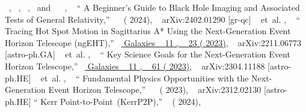 \documentclass[aps,reprint,superscriptaddress,nofootinbib,floatfix,longbibliography,preprintnumbers]{revtex4-1}
\begin{document}
\begin{thebibliography}{139}
  \BibitemOpen
   { { \  },  { \  },  { \  },  \  and \   { \  }, \  } {\enquote { {{A Beginner's Guide to Black Hole Imaging and Associated Tests of General Relativity}},} \  }\href@noop {} { \   ( {2024})}, \   {arXiv:2402.01290 [gr-qc]} 
  \BibitemOpen
   { { \  }  et~al. , \  } {\enquote { {{Tracing Hot Spot Motion in Sagittarius A* Using the Next-Generation Event Horizon Telescope (ngEHT)}},} \  }\href {\doibase 10.3390/galaxies11010023} { { {Galaxies} \  }  {11} , \   {23} ( {2023})}, \   {arXiv:2211.06773 [astro-ph.GA]} 
  \BibitemOpen
   { { \  }  et~al. , \  } {\enquote { {{Key Science Goals for the Next-Generation Event Horizon Telescope}},} \  }\href {\doibase 10.3390/galaxies11030061} { { {Galaxies} \  }  {11} , \   {61} ( {2023})}, \   {arXiv:2304.11188 [astro-ph.HE]} 
  \BibitemOpen
   { {~}  et~al. , \  } {\enquote { {{Fundamental Physics Opportunities with the Next-Generation Event Horizon Telescope}},} \  }\href@noop {} { \   ( {2023})}, \   {arXiv:2312.02130 [astro-ph.HE]} 
  \BibitemOpen
  \href@noop {} {\enquote { {{Kerr Point-to-Point~(KerrP2P)}},} \  } ( {2024}), \  

\end{thebibliography}
\end{document}
